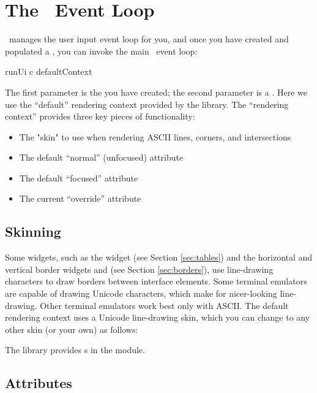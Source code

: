 \section{The \vtyui\ Event Loop}
\label{sec:event_loop}

\vtyui\ manages the user input event loop for you, and once you have
created and populated a , you can invoke the main
\vtyui\ event loop:

\begin{haskellcode}
 runUi c defaultContext
\end{haskellcode}

The first parameter is the  you have created; the
second parameter is a .  Here we use the
``default'' rendering context provided by the library.  The
``rendering context'' provides three key pieces of functionality:

\begin{itemize}
\item The "skin" to use when rendering ASCII lines, corners, and
      intersections
\item The default ``normal'' (unfocused) attribute
\item The default ``focused'' attribute
\item The current ``override'' attribute
\end{itemize}

\subsection{Skinning}
\label{sec:skinning}

Some widgets, such as the  widget (see Section
\ref{sec:tables}) and the horizontal and vertical border widgets
 and  (see Section \ref{sec:borders}), use
line-drawing characters to draw borders between interface elements.
Some terminal emulators are capable of drawing Unicode characters,
which make for nicer-looking line-drawing.  Other terminal emulators
work best only with ASCII.  The default rendering context uses a
Unicode line-drawing skin, which you can change to any other skin (or
your own) as follows:


The library provides s in the  module.

\subsection{Attributes}
\label{sec:attributes}

